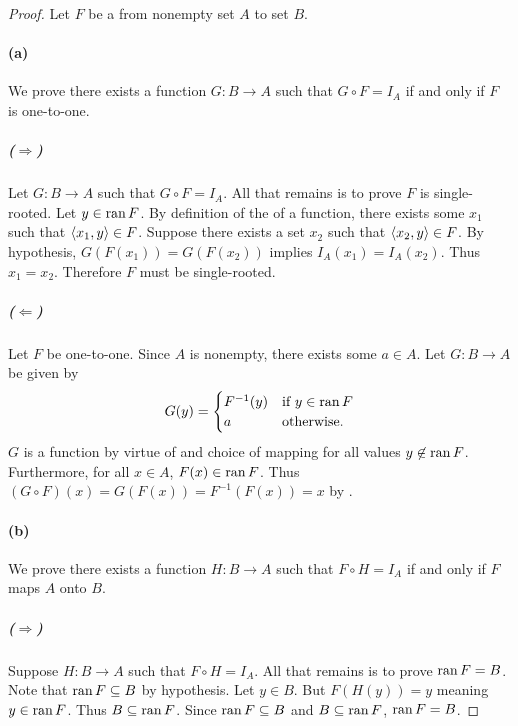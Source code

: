 \documentclass{report}
\begin{document}
  \begin{proof}
    Let $F$ be a  from nonempty set $A$ to set $B$.

    \paragraph{(a)}%

      We prove there exists a function $G \colon B \rightarrow A$ such that
        $G \circ F = I_A$ if and only if $F$ is one-to-one.

      \subparagraph{($\Rightarrow$)}%

        Let $G \colon B \rightarrow A$ such that $G \circ F = I_A$.
        All that remains is to prove $F$ is single-rooted.
        Let $y \in \mathop{\text{ran}}{F}$.
        By definition of the  of a function, there exists
          some $x_1$ such that $\left< x_1, y \right> \in F$.
        Suppose there exists a set $x_2$ such that $\left< x_2, y \right> \in F$.
        By hypothesis, $G(F(x_1)) = G(F(x_2))$ implies $I_A(x_1) = I_A(x_2)$.
        Thus $x_1 = x_2$.
        Therefore $F$ must be single-rooted.

      \subparagraph{($\Leftarrow$)}%

        Let $F$ be one-to-one.
        Since $A$ is nonempty, there exists some $a \in A$.
        Let $G \colon B \rightarrow A$ be given by
          $$G(y) = \begin{cases}
            F^{-1}(y) & \text{if } y \in \mathop{\text{ran}}{F} \\
            a & \text{otherwise}.
          \end{cases}$$
        $G$ is a function by virtue of  and
          choice of mapping for all values $y \not\in \mathop{\text{ran}}{F}$.
        Furthermore, for all $x \in A$, $F(x) \in \mathop{\text{ran}}{F}$.
        Thus $(G \circ F)(x) = G(F(x)) = F^{-1}(F(x)) = x$ by
          .

    \paragraph{(b)}%

      We prove there exists a function $H \colon B \rightarrow A$ such that
        $F \circ H = I_A$ if and only if $F$ maps $A$ onto $B$.

      \subparagraph{($\Rightarrow$)}%

        Suppose $H \colon B \rightarrow A$ such that $F \circ H = I_A$.
        All that remains is to prove $\mathop{\text{ran}}{F} = B$.
        Note that $\mathop{\text{ran}}{F} \subseteq B$ by hypothesis.
        Let $y \in B$.
        But $F(H(y)) = y$ meaning $y \in \mathop{\text{ran}}{F}$.
        Thus $B \subseteq \mathop{\text{ran}}{F}$.
        Since $\mathop{\text{ran}}{F} \subseteq B$ and $B \subseteq \mathop{\text{ran}}{F}$, $\mathop{\text{ran}}{F} = B$.


\end{proof}
\end{document}
